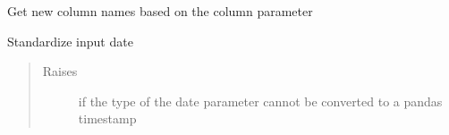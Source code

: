 \documentclass[letterpaper,10pt,english]{sphinxmanual}
\begin{document}

\begin{fulllineitems}
\label{\detokenize{dalio.util:dalio.util.process_new_colnames}}
Get new column names based on the column parameter

\end{fulllineitems}


\begin{fulllineitems}
\label{\detokenize{dalio.util:dalio.util.process_date}}
Standardize input date
\begin{quote}\begin{description}
\item[{Raises}] \leavevmode
{} \textendash{} if the type of the date parameter cannot be converted to
    a pandas timestamp

\end{description}\end{quote}

\end{fulllineitems}

\end{document}
